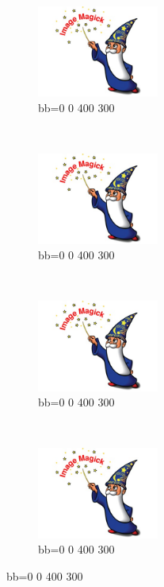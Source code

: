 \documentclass[french]{article}
\begin{document}
\begin{figure}[h]
    \centering
    \begin{subfigure}[b]{0.3\textwidth}
        \includegraphics[bb=0 0 400 300,height=3cm]{test.jpg}
        \caption{bb=0 0 400 300}
        \label{essai_1}
    \end{subfigure}
    ~ %
    \begin{subfigure}[b]{0.3\textwidth}
        \includegraphics[bb=0 0 400 300,height=3cm]{test.jpg}
        \caption{bb=0 0 400 300}
        \label{essai_2}
    \end{subfigure}
    ~
    \begin{subfigure}[b]{0.3\textwidth}
        \includegraphics[bb=0 0 400 300,height=3cm]{test.jpg}
        \caption{bb=0 0 400 300}
        \label{essai_3}
    \end{subfigure}
    \\
    \begin{subfigure}[b]{0.3\textwidth}
        \includegraphics[bb=0 0 400 300,height=3cm]{test.jpg}
        \caption{bb=0 0 400 300}
        \label{essai_4}
    \end{subfigure}

\end{figure}
\end{document}
